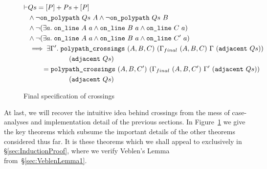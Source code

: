 \begin{figure}
  \begin{multline}\label{eq:changeTriangle}
  \begin{aligned}
    \vdash&Qs = [P] + Ps + [P]\\
    &\wedge \neg\texttt{on\_polypath}\ Qs\ A \wedge \neg\texttt{on\_polypath}\ Qs\ B\\
    &\wedge \neg(\exists a.\; \texttt{on\_line}\ A\ a\wedge \texttt{on\_line}\ B\ a\wedge \texttt{on\_line}\ C\ a)\\
    &\wedge \neg(\exists a.\; \texttt{on\_line}\ A\ a\wedge \texttt{on\_line}\ B\ a\wedge \texttt{on\_line}\ C'\ a)\\
    &\implies \exists \Gamma'.\; \texttt{polypath\_crossings}\ (A,B,C)\ (\Gamma_{final}\ (A,B,C)\ \Gamma\ (\texttt{adjacent}\ Qs))\\
    &\qquad\qquad\qquad(\texttt{adjacent}\ Qs)\\
    &\qquad = \texttt{polypath\_crossings}\ (A,B,C')\ (\Gamma_{final}\ (A,B,C')\ \Gamma'\ (\texttt{adjacent}\ Qs))\\
    &\qquad\qquad\qquad(\texttt{adjacent}\ Qs)
  \end{aligned}
\end{multline}
\caption{Final specification of crossings}
\label{fig:CrossingsSpecification}
\end{figure}

At last, we will recover the intuitive idea behind crossings from the mess of case-analyses and implementation detail of the previous sections. In Figure~\ref{fig:CrossingsSpecification} we give the key theorems which subsume the important details of the other theorems considered thus far. It is these theorems which we shall appeal to exclusively in \S\ref{sec:InductionProof}, where we verify Veblen's Lemma from~\S\ref{sec:VeblenLemma1}.

